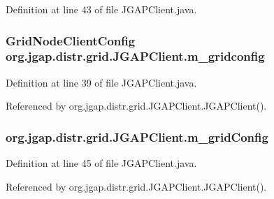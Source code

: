 Definition at line 43 of file J\-G\-A\-P\-Client.\-java.

\hypertarget{classorg_1_1jgap_1_1distr_1_1grid_1_1_j_g_a_p_client_acdd8efaedc2f7a6dd064fa5373ad1dd4}{
\subsubsection[{m\-\_\-gridconfig}]{\setlength{\rightskip}{0pt plus 5cm}Grid\-Node\-Client\-Config org.\-jgap.\-distr.\-grid.\-J\-G\-A\-P\-Client.\-m\-\_\-gridconfig\hspace{0.3cm}{\ttfamily [protected]}}}\label{classorg_1_1jgap_1_1distr_1_1grid_1_1_j_g_a_p_client_acdd8efaedc2f7a6dd064fa5373ad1dd4}


Definition at line 39 of file J\-G\-A\-P\-Client.\-java.



Referenced by org.\-jgap.\-distr.\-grid.\-J\-G\-A\-P\-Client.\-J\-G\-A\-P\-Client().

\hypertarget{classorg_1_1jgap_1_1distr_1_1grid_1_1_j_g_a_p_client_afc5c5a6b65207304d89e04e319ee8a1a}{
\subsubsection[{m\-\_\-grid\-Config}]{ org.\-jgap.\-distr.\-grid.\-J\-G\-A\-P\-Client.\-m\-\_\-grid\-Config\hspace{0.3cm}{\ttfamily [private]}}}\label{classorg_1_1jgap_1_1distr_1_1grid_1_1_j_g_a_p_client_afc5c5a6b65207304d89e04e319ee8a1a}


Definition at line 45 of file J\-G\-A\-P\-Client.\-java.



Referenced by org.\-jgap.\-distr.\-grid.\-J\-G\-A\-P\-Client.\-J\-G\-A\-P\-Client().

